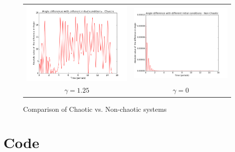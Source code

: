 \documentclass[11pt]{article}
\begin{document}
\begin{figure}
\begin{tabular}{cc}
\includegraphics[scale=.3]{deltathetachaos.png}&

\includegraphics[scale=.3]{deltathetanochaos.png}\\
 $\gamma = 1.25 $ & $\gamma = 0 $ \\[6pt]
\end{tabular}
\caption{Comparison of Chaotic vs. Non-chaotic systems}
\end{figure}

\section{Code}
\end{document}
